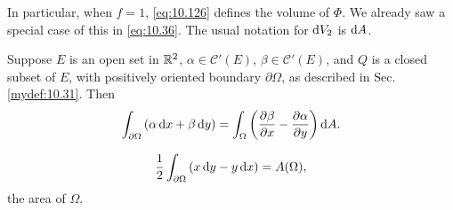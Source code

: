 In particular, when $f= 1$, \eqref{eq:10.126} defines the volume of $\Phi$. 
We already saw a special case of this in \eqref{eq:10.36}.
The usual notation for $\d V_2$ is $\d A$.

\begin{mydef}
    \label{mydef:10.45}
    Suppose $E$ is an open set in ${\protect\mathbb R}^2$, $\alpha \in  \mathscr{C}'(E)$, $\beta \in  \mathscr{C}'(E)$,
    and $Q$ is a closed subset of $E$, with positively oriented boundary $\partial \Omega$, as described
    in Sec. \ref{mydef:10.31}. Then
    \begin{equation}
        \label{eq:10.127}
        \int_{\partial \Omega} \left( 
            \alpha \d x + \beta \d y 
            \right) = 
        \int_{\Omega} \left( 
            \frac{\partial \beta}{\partial x} -
            \frac{\partial \alpha}{\partial y} 
            \right) \d A .
    \end{equation}
\end{mydef}

\begin{equation}
    \label{eq:10.128}
    \frac{1}{2} \int_{\partial \Omega}
    \left( x \d y - y \d x \right) = 
    A(\Omega) ,
\end{equation}
the area of $\Omega$.


